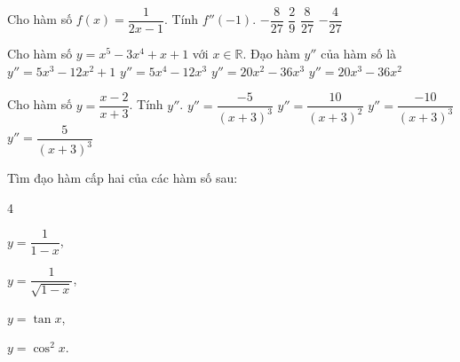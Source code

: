 \begin{ex}%
	Cho  hàm số $f(x)=\dfrac{1}{2x-1}$. Tính $f''(-1)$.
	\choice 
		 {\True $-\dfrac{8}{27}$}
		 {$\dfrac{2}{9}$}
		 {$\dfrac{8}{27}$}
		 {$-\dfrac{4}{27}$}
\end{ex}

\begin{ex}%
	Cho hàm số $y=x^5-3x^4+x+1$ với $x\in\mathbb{R}$. Đạo hàm $y''$ của hàm  số là
	\choice 
		 {$y''=5x^3-12x^2+1$}
		 {$y''=5x^4-12x^3$}
		 {$y''=20x^2-36x^3$}
		{\True  $y''=20x^3-36x^2$}
\end{ex}

\begin{ex}%
	Cho hàm số $y=\dfrac{x-2}{x+3}$.  Tính $y''$.
	 \choice
		 {$y''=\dfrac{-5}{(x+3)^3}$}
		{$y''=\dfrac{10}{(x+3)^2}$} 
		{\True  $y''=\dfrac{-10}{(x+3)^3}$}
		{$y''=\dfrac{5}{(x+3)^3}$} 
\end{ex}

\begin{ex}%
	Tìm đạo hàm cấp hai của các hàm số  sau:
	\begin{enumEX}{4}
		\item $y=\dfrac{1}{1-x}$, 
		\item  $y=\dfrac{1}{\sqrt{1-x}}$,
		\item $y=\tan  x$,
		 \item $y=\cos^2x$.
	\end{enumEX}
\end{ex}

